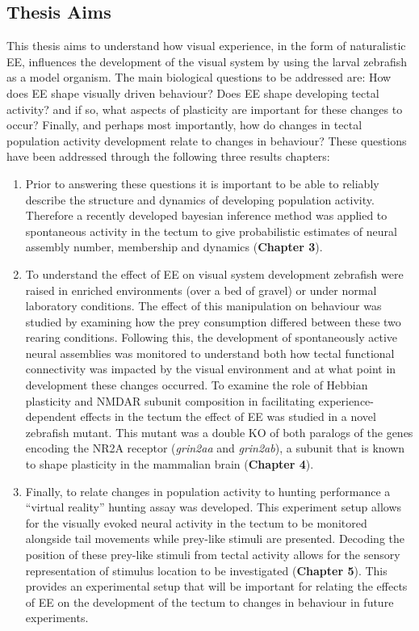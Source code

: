 \subsection{Thesis Aims}
This thesis aims to understand how visual experience, in the form of naturalistic EE, influences the development of the visual system by using the larval zebrafish as a model organism.  The main biological questions to be addressed are: How does EE shape visually driven behaviour? Does EE shape developing tectal activity? and if so, what aspects of plasticity are important for these changes to occur? Finally, and perhaps most importantly, how do changes in tectal population activity development relate to changes in behaviour? These questions have been addressed through the following three results chapters:

\begin{enumerate}
    \item Prior to answering these questions it is important to be able to reliably describe the structure and dynamics of developing population activity. Therefore a recently developed bayesian inference method was applied to spontaneous activity in the tectum to give probabilistic estimates of neural assembly number, membership and dynamics (\textbf{Chapter 3}).
    
    \item To understand the effect of EE on visual system development zebrafish were raised in enriched environments (over a bed of gravel) or under normal laboratory conditions. The effect of this manipulation on behaviour was studied by examining how the prey consumption differed between these two rearing conditions. Following this, the development of spontaneously active neural assemblies was monitored to understand both how tectal functional connectivity was impacted by the visual environment and at what point in development these changes occurred. To examine the role of Hebbian plasticity and NMDAR subunit composition in facilitating experience-dependent effects in the tectum the effect of EE was studied in a novel zebrafish mutant. This mutant was a double KO of both paralogs of the genes encoding the NR2A receptor (\textit{grin2aa} and \textit{grin2ab}), a subunit that is known to shape plasticity in the mammalian brain (\textbf{Chapter 4}).
    
    \item Finally, to relate changes in population activity to hunting performance a “virtual reality” hunting assay was developed. This experiment setup allows for the visually evoked neural activity in the tectum to be monitored alongside tail movements while prey-like stimuli are presented. Decoding the position of these prey-like stimuli from tectal activity allows for the sensory representation of stimulus location to be investigated (\textbf{Chapter 5}). This provides an experimental setup that will be important for relating the effects of EE on the development of the tectum to changes in behaviour in future experiments. 
    
\end{enumerate}
